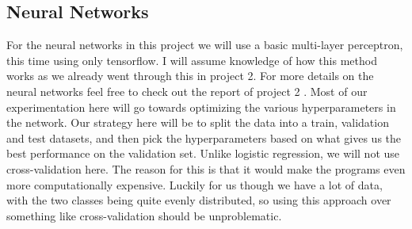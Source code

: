\documentclass{article}
\begin{document}
\subsection{Neural Networks}
For the neural networks in this project we will use a basic multi-layer
perceptron, this time using only tensorflow. I will assume knowledge of how
this method works as we already went through this in project 2. For more details
on the neural networks feel free to check out the report of project 2
\cite[s.~3.7]{reportproject2}. Most of our experimentation here will go towards
optimizing the various hyperparameters in the network. Our strategy here will be
to split the data into a train, validation and test datasets, and then pick the
hyperparameters based on what gives us the best performance on the validation
set.  Unlike logistic regression, we will not use cross-validation here. The
reason for this is that it would make the programs even more computationally
expensive. Luckily for us though we have a lot of data, with the two classes
being quite evenly distributed, so using this approach over something like
cross-validation should be unproblematic.
\end{document}
